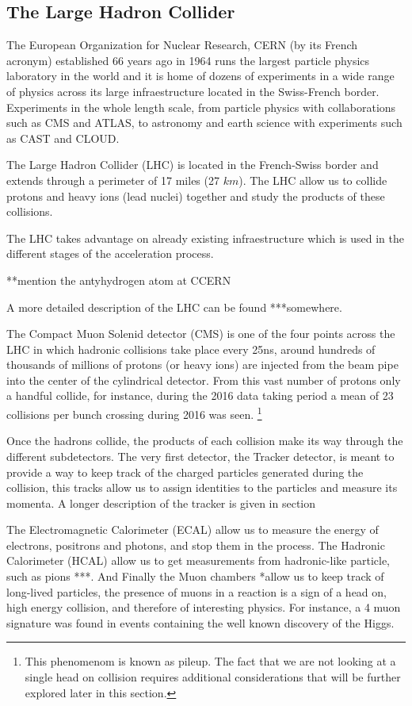 

\subsection{The Large Hadron Collider}

The European Organization for Nuclear Research, CERN (by its French acronym)
established 66 years ago in 1964 runs the largest particle physics laboratory in
the world and it is home of dozens of experiments in a wide range of physics
across its large infraestructure located in the Swiss-French border. Experiments
in the whole length scale, from particle physics with collaborations such as
CMS and ATLAS, to astronomy and earth science with experiments such as CAST
and CLOUD.

The Large Hadron Collider (LHC) is located in the French-Swiss border and
extends through a perimeter of 17 miles (27 $km$). The LHC allow us to collide
protons and heavy ions (lead nuclei) together and study the products of these
collisions.

The LHC takes advantage on already existing infraestructure which is used in the
different stages of the acceleration process.

**mention the antyhydrogen atom at CCERN

A more detailed description of the LHC can be found ***somewhere.

The Compact Muon Solenid detector (CMS) is one of the four points across the LHC
in which hadronic collisions take place every 25ns, around hundreds of thousands
of millions of protons (or heavy ions) are injected from the beam pipe
into the center of the cylindrical detector. From this vast number of protons
only a handful collide, for instance, during the 2016 data taking period a mean
of 23 collisions per bunch crossing during 2016 was seen. \footnote{ This
  phenomenom is known as pileup. The fact that we are not looking at a single
  head on collision requires additional considerations that will be further
  explored later in this section.}

Once the hadrons collide, the products of each collision make its way through
the different subdetectors. The very first detector, the Tracker detector, is
meant to provide a way to keep track of the charged particles generated during
the collision, this tracks allow us to assign identities to the particles and
measure its momenta. A longer description of the tracker is given in section

The Electromagnetic Calorimeter (ECAL) allow us to measure the energy of electrons,
positrons and photons, and stop them in the process. The Hadronic Calorimeter (HCAL)
allow us to get measurements from hadronic-like particle, such as pions ***. And Finally
the Muon chambers *allow us to keep track of long-lived particles, the presence
of muons in a reaction is a sign of a head on, high energy collision, and therefore
of interesting physics. For instance, a 4 muon signature was found in events
containing the well known discovery of the Higgs.

